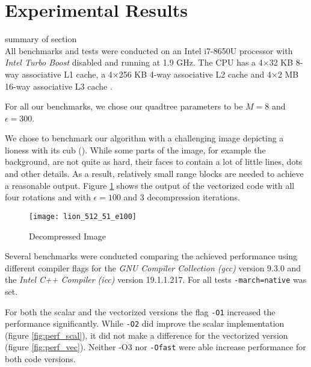 \section{Experimental Results}\label{sec:exp}

summary of section\\

 All benchmarks and tests were conducted on an Intel
i7-8650U processor with \textit{Intel Turbo Boost} disabled and running at 1.9
GHz. The CPU has a 4$\times$32 KB 8-way associative L1 cache, a 4$\times$256 KB
4-way associative L2 cache and 4$\times$2 MB 16-way associative L3 cache
\cite{intel-opt-manual}.

For all our benchmarks, we chose our quadtree parameters to be $M=8$ and $\epsilon=300$.

We chose to benchmark our algorithm with a challenging image depicting a lioness
with its cub (\cite{lions}). While some parts of the image, for example the
background, are not quite as hard, their faces to contain a lot of little lines,
dots and other details. As a result, relatively small range blocks are needed to
achieve a reasonable output. Figure \ref{fig:lions} shows the output of the
vectorized code with all four rotations and with $\epsilon=100$ and 3
decompression iterations.
\begin{figure}[H]
  \centering
  \texttt{[image: lion\_512\_51\_e100]}
  \caption{Decompressed Image}
  \label{fig:lions}
\end{figure}


 Several benchmarks were conducted comparing the achieved
performance using different compiler flags for the \textit{GNU Compiler
  Collection (gcc)} version 9.3.0 and the \textit{Intel C++ Compiler (icc)}
version 19.1.1.217. For all tests \texttt{-march=native} was set.

For both the scalar and the vectorized versions the flag \texttt{-O1} increased
the performance significantly. While \texttt{-O2} did improve the scalar
implementation (figure \ref{fig:perf_scal}), it did not make a difference for
the vectorized version (figure \ref{fig:perf_vec}). Neither \textsc{-O3} nor
\texttt{-Ofast} were able increase performance for both code versions.

